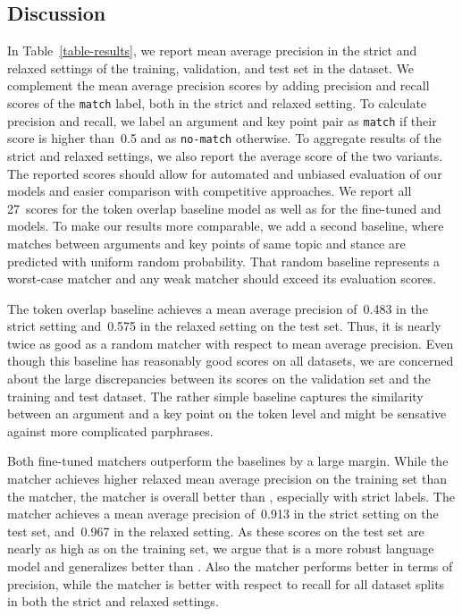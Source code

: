 \subsection{Discussion}
In Table~\ref{table-results}, we report mean average precision in the strict and relaxed settings of the training, 
validation, and test set in the \ArgKP dataset.
We complement the mean average precision scores by adding precision and recall scores of the \texttt{match} label, 
both in the strict and relaxed setting. To calculate precision and recall, we label an argument and key point pair as \texttt{match} if their score is higher than~0.5 and as \texttt{no-match} otherwise.
To aggregate results of the strict and relaxed settings, we also report the average score of the two variants.
The reported scores should allow for automated and unbiased evaluation of our models and easier comparison with competitive approaches.
We report all 27~scores for the token overlap baseline model as well as for the fine-tuned \BertBase and \RobertaBase models.
To make our results more comparable, we add a second baseline, where matches between arguments and key points of same 
topic and stance are predicted with uniform random probability.
That random baseline represents a worst-case matcher and any weak matcher should exceed its evaluation scores.

The token overlap baseline achieves a mean average precision of~0.483 in the strict setting and~0.575 in the relaxed 
setting on the test set.
Thus, it is nearly twice as good as a random matcher with respect to mean average precision.
Even though this baseline has reasonably good scores on all datasets, we are concerned about the large discrepancies 
between its scores on the validation set and the training and test dataset. 
The rather simple baseline captures the similarity between an argument and a key point on the token level and might be sensative against more complicated parphrases.

Both fine-tuned matchers outperform the baselines by a large margin.
While the \BertBase matcher achieves higher relaxed mean average precision on the training set than the \RobertaBase 
matcher, the \RobertaBase matcher is overall better than \Bert, especially with strict labels.
The \RobertaBase matcher achieves a mean average precision of~0.913 in the strict setting on the test set, and~0.967 
in the relaxed setting.
As these scores on the test set are nearly as high as on the training set, we argue that \Roberta is a more robust 
language model and generalizes better than \Bert.
Also the \RobertaBase matcher performs better in terms of precision, while the \BertBase matcher is better with respect to 
recall for all dataset splits in both the strict and relaxed settings.
